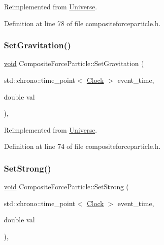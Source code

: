 Reimplemented from \mbox{\hyperlink{class_universe_a608aa95698380f791a0ffba45cc1bee3}{Universe}}.



Definition at line 78 of file compositeforceparticle.\+h.

\mbox{\label{class_composite_force_particle_ad9e1553ab0096230edd591e3135b223d}} 
\subsubsection{\texorpdfstring{Set\+Gravitation()}{SetGravitation()}}
{\footnotesize\ttfamily \mbox{\hyperlink{glad_8h_a950fc91edb4504f62f1c577bf4727c29}{void}} Composite\+Force\+Particle\+::\+Set\+Gravitation (\begin{DoxyParamCaption}\item[{std\+::chrono\+::time\+\_\+point$<$ \mbox{\hyperlink{universe_8h_a0ef8d951d1ca5ab3cfaf7ab4c7a6fd80}{Clock}} $>$}]{event\+\_\+time,  }\item[{double}]{val }\end{DoxyParamCaption})\hspace{0.3cm}{\ttfamily [inline]}, {\ttfamily [virtual]}}



Reimplemented from \mbox{\hyperlink{class_universe_ae0cb8d86b2fbb8396d605160344b42f5}{Universe}}.



Definition at line 74 of file compositeforceparticle.\+h.

\mbox{\label{class_composite_force_particle_a06488ef0457335648b161d3ed746b643}} 
\subsubsection{\texorpdfstring{Set\+Strong()}{SetStrong()}}
{\footnotesize\ttfamily \mbox{\hyperlink{glad_8h_a950fc91edb4504f62f1c577bf4727c29}{void}} Composite\+Force\+Particle\+::\+Set\+Strong (\begin{DoxyParamCaption}\item[{std\+::chrono\+::time\+\_\+point$<$ \mbox{\hyperlink{universe_8h_a0ef8d951d1ca5ab3cfaf7ab4c7a6fd80}{Clock}} $>$}]{event\+\_\+time,  }\item[{double}]{val }\end{DoxyParamCaption})\hspace{0.3cm}{\ttfamily [inline]}, {\ttfamily [virtual]}}



